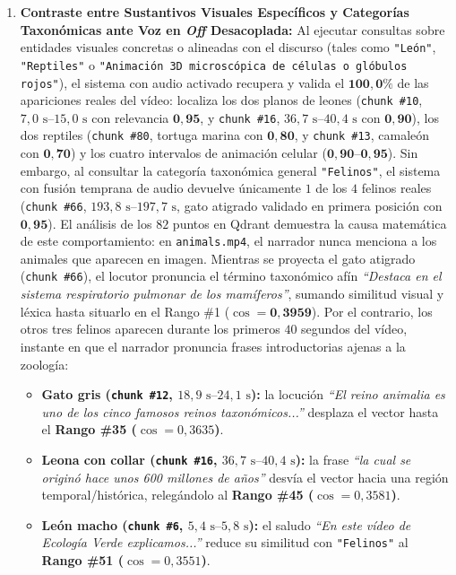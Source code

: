 \begin{enumerate}
    \item \textbf{Contraste entre Sustantivos Visuales Específicos y Categorías Taxonómicas ante Voz en \textit{Off} Desacoplada:}
    Al ejecutar consultas sobre entidades visuales concretas o alineadas con el discurso (tales como \texttt{\string"León\string"}, \texttt{\string"Reptiles\string"} o \texttt{\string"Animación 3D microscópica de células o glóbulos rojos\string"}), el sistema con audio activado recupera y valida el $\mathbf{100,0\%}$ de las apariciones reales del vídeo: localiza los dos planos de leones (\texttt{chunk \#10}, $7,0\text{ s--}15,0\text{ s}$ con relevancia $\mathbf{0,95}$, y \texttt{chunk \#16}, $36,7\text{ s--}40,4\text{ s}$ con $\mathbf{0,90}$), los dos reptiles (\texttt{chunk \#80}, tortuga marina con $\mathbf{0,80}$, y \texttt{chunk \#13}, camaleón con $\mathbf{0,70}$) y los cuatro intervalos de animación celular ($\mathbf{0,90\text{--}0,95}$).
    Sin embargo, al consultar la categoría taxonómica general \texttt{"Felinos"}, el sistema con fusión temprana de audio devuelve únicamente $1$ de los $4$ felinos reales (\texttt{chunk \#66}, $193,8\text{ s--}197,7\text{ s}$, gato atigrado validado en primera posición con $\mathbf{0,95}$).
    El análisis de los $82$ puntos en Qdrant demuestra la causa matemática de este comportamiento: en \texttt{animals.mp4}, el narrador nunca menciona a los animales que aparecen en imagen.
    Mientras se proyecta el gato atigrado (\texttt{chunk \#66}), el locutor pronuncia el término taxonómico afín \textit{``Destaca en el sistema respiratorio pulmonar de los mamíferos''}, sumando similitud visual y léxica hasta situarlo en el Rango \#1 ($\cos = \mathbf{0,3959}$).
    Por el contrario, los otros tres felinos aparecen durante los primeros $40$ segundos del vídeo, instante en que el narrador pronuncia frases introductorias ajenas a la zoología:
    \begin{itemize}
        \item \textbf{Gato gris (\texttt{chunk \#12}, $18,9\text{ s--}24,1\text{ s}$):} la locución \textit{``El reino animalia es uno de los cinco famosos reinos taxonómicos...''} desplaza el vector hasta el \textbf{Rango \#35 ($\cos = 0,3635$)}.
        \item \textbf{Leona con collar (\texttt{chunk \#16}, $36,7\text{ s--}40,4\text{ s}$):} la frase \textit{``la cual se originó hace unos 600 millones de años''} desvía el vector hacia una región temporal/histórica, relegándolo al \textbf{Rango \#45 ($\cos = 0,3581$)}.
        \item \textbf{León macho (\texttt{chunk \#6}, $5,4\text{ s--}5,8\text{ s}$):} el saludo \textit{``En este vídeo de Ecología Verde explicamos...''} reduce su similitud con \texttt{"Felinos"} al \textbf{Rango \#51 ($\cos = 0,3551$)}.

\end{itemize}
\end{enumerate}
